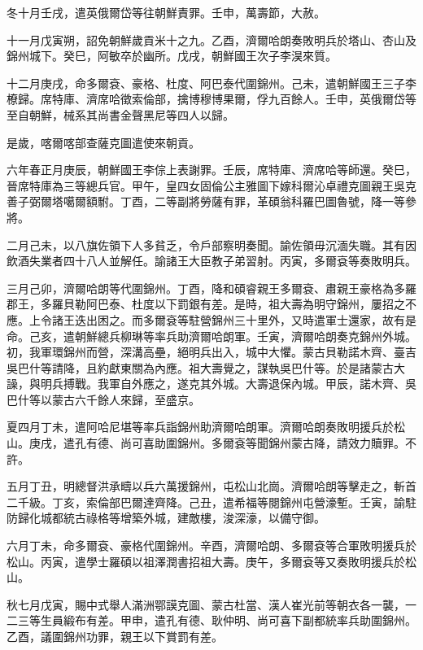 \begin{pinyinscope}
冬十月壬戌，遣英俄爾岱等往朝鮮責罪。壬申，萬壽節，大赦。

十一月戊寅朔，詔免朝鮮歲貢米十之九。乙酉，濟爾哈朗奏敗明兵於塔山、杏山及錦州城下。癸巳，阿敏卒於幽所。戊戌，朝鮮國王次子李淏來質。

十二月庚戌，命多爾袞、豪格、杜度、阿巴泰代圍錦州。己未，遣朝鮮國王三子李橑歸。席特庫、濟席哈徵索倫部，擒博穆博果爾，俘九百餘人。壬申，英俄爾岱等至自朝鮮，械系其尚書金聲黑尼等四人以歸。

是歲，喀爾喀部查薩克圖遣使來朝貢。

六年春正月庚辰，朝鮮國王李倧上表謝罪。壬辰，席特庫、濟席哈等師還。癸巳，晉席特庫為三等總兵官。甲午，皇四女固倫公主雅圖下嫁科爾沁卓禮克圖親王吳克善子弼爾塔噶爾額駙。丁酉，二等副將勞薩有罪，革碩翁科羅巴圖魯號，降一等參將。

二月己未，以八旗佐領下人多貧乏，令戶部察明奏聞。諭佐領毋沉湎失職。其有因飲酒失業者四十八人並解任。諭諸王大臣教子弟習射。丙寅，多爾袞等奏敗明兵。

三月己卯，濟爾哈朗等代圍錦州。丁酉，降和碩睿親王多爾袞、肅親王豪格為多羅郡王，多羅貝勒阿巴泰、杜度以下罰銀有差。是時，祖大壽為明守錦州，屢招之不應。上令諸王迭出困之。而多爾袞等駐營錦州三十里外，又時遣軍士還家，故有是命。己亥，遣朝鮮總兵柳琳等率兵助濟爾哈朗軍。壬寅，濟爾哈朗奏克錦州外城。初，我軍環錦州而營，深溝高壘，絕明兵出入，城中大懼。蒙古貝勒諾木齊、臺吉吳巴什等請降，且約獻東關為內應。祖大壽覺之，謀執吳巴什等。於是諸蒙古大譟，與明兵搏戰。我軍自外應之，遂克其外城。大壽退保內城。甲辰，諾木齊、吳巴什等以蒙古六千餘人來歸，至盛京。

夏四月丁未，遣阿哈尼堪等率兵詣錦州助濟爾哈朗軍。濟爾哈朗奏敗明援兵於松山。庚戌，遣孔有德、尚可喜助圍錦州。多爾袞等聞錦州蒙古降，請效力贖罪。不許。

五月丁丑，明總督洪承疇以兵六萬援錦州，屯松山北崗。濟爾哈朗等擊走之，斬首二千級。丁亥，索倫部巴爾達齊降。己丑，遣希福等閱錦州屯營濠塹。壬寅，諭駐防歸化城都統古祿格等增築外城，建敵樓，浚深濠，以備守御。

六月丁未，命多爾袞、豪格代圍錦州。辛酉，濟爾哈朗、多爾袞等合軍敗明援兵於松山。丙寅，遣學士羅碩以祖澤潤書招祖大壽。庚午，多爾袞等又奏敗明援兵於松山。

秋七月戊寅，賜中式舉人滿洲鄂謨克圖、蒙古杜當、漢人崔光前等朝衣各一襲，一二三等生員緞布有差。甲申，遣孔有德、耿仲明、尚可喜下副都統率兵助圍錦州。乙酉，議圍錦州功罪，親王以下賞罰有差。


\end{pinyinscope}
